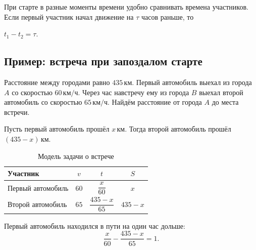 \documentclass[a4paper,12pt]{article}
\newcommand{\unit}[1]{\,\text{#1}}
\newcommand{\formula}[1]{%
  \begin{center}
    \large\color{darkaccent}\ensuremath{#1}
  \end{center}
}
\begin{document}
\begin{center}
\end{center}

При старте в разные моменты времени удобно сравнивать времена участников.
Если первый участник начал движение на $\tau$ часов раньше, то
\formula{
  t_1-t_2=\tau.
}

\subsection{Пример: встреча при запоздалом старте}

Расстояние между городами равно $435\unit{км}$.
Первый автомобиль выехал из города $A$ со скоростью
$60\unit{км/ч}$.
Через час навстречу ему из города $B$ выехал второй автомобиль
со скоростью $65\unit{км/ч}$.
Найдём расстояние от города $A$ до места встречи.

Пусть первый автомобиль прошёл $x\unit{км}$.
Тогда второй автомобиль прошёл $(435-x)\unit{км}$.

\begin{table}[ht]
\centering
\caption{Модель задачи о встрече}
\begin{tabularx}{\linewidth}{@{}X c c c@{}}
\toprule
Участник & $v$ & $t$ & $S$ \\
\midrule
Первый автомобиль
& $60$
& $\dfrac{x}{60}$
& $x$ \\
Второй автомобиль
& $65$
& $\dfrac{435-x}{65}$
& $435-x$ \\
\bottomrule
\end{tabularx}
\end{table}

Первый автомобиль находился в пути на один час дольше:
\[
\frac{x}{60}
-
\frac{435-x}{65}
=
1.
\]
\end{document}
